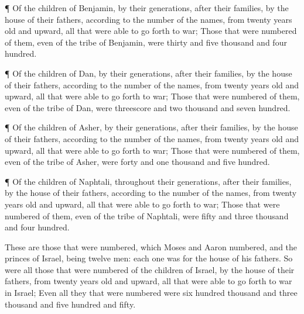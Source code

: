 ¶ Of the children of Benjamin, by their generations, after
their families, by the house of their fathers, according to the number
of the names, from twenty years old and upward, all that were able to go
forth to war;  Those that were numbered of them, even of
the tribe of Benjamin, were thirty and five thousand and four hundred.

 ¶ Of the children of Dan, by their generations, after
their families, by the house of their fathers, according to the number
of the names, from twenty years old and upward, all that were able to go
forth to war;  Those that were numbered of them, even of
the tribe of Dan, were threescore and two thousand and seven hundred.

 ¶ Of the children of Asher, by their generations, after
their families, by the house of their fathers, according to the number
of the names, from twenty years old and upward, all that were able to go
forth to war;  Those that were numbered of them, even of
the tribe of Asher, were forty and one thousand and five hundred.

 ¶ Of the children of Naphtali, throughout their
generations, after their families, by the house of their fathers,
according to the number of the names, from twenty years old and upward,
all that were able to go forth to war;  Those that were
numbered of them, even of the tribe of Naphtali, were fifty and three
thousand and four hundred.

 These are those that were numbered, which Moses and Aaron
numbered, and the princes of Israel, being twelve men: each one was for
the house of his fathers.  So were all those that were
numbered of the children of Israel, by the house of their fathers, from
twenty years old and upward, all that were able to go forth to war in
Israel;  Even all they that were numbered were six hundred
thousand and three thousand and five hundred and fifty.

